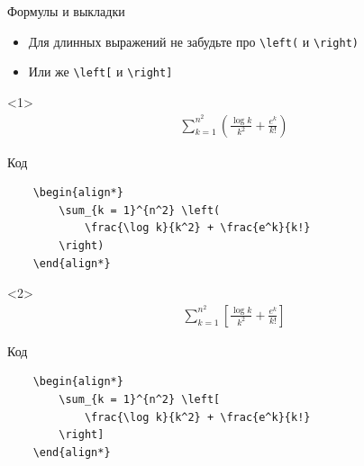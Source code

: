 \begin{frame}[fragile]{Формулы и выкладки}

\begin{itemize}[<+->]
    \item Для длинных выражений не забудьте про \lstinline!\left(! и \lstinline!\right)!
    \item Или же \lstinline!\left[! и \lstinline!\right]!
\end{itemize}

\begin{onlyenv}<1>
    \begin{align*}
        \sum_{k = 1}^{n^2} \left( \frac{\log k}{k^2} + \frac{e^k}{k!} \right)
    \end{align*}
    
    \begin{block}{Код}
        \begin{lstlisting}
    \begin{align*}
        \sum_{k = 1}^{n^2} \left( 
            \frac{\log k}{k^2} + \frac{e^k}{k!} 
        \right)
    \end{align*}
        \end{lstlisting}
    \end{block}
\end{onlyenv}

\begin{onlyenv}<2>
    \begin{align*}
        \sum_{k = 1}^{n^2} \left[ \frac{\log k}{k^2} + \frac{e^k}{k!} \right]
    \end{align*}
    
    \begin{block}{Код}
        \begin{lstlisting}
    \begin{align*}
        \sum_{k = 1}^{n^2} \left[
            \frac{\log k}{k^2} + \frac{e^k}{k!} 
        \right]
    \end{align*}
        \end{lstlisting}
    \end{block}
\end{onlyenv}

\end{frame}


